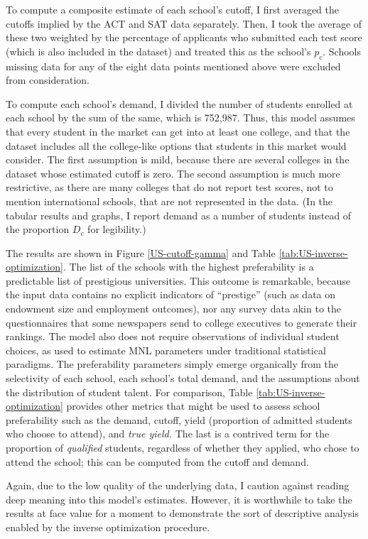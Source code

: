 \documentclass[12pt]{article}
\theoremstyle{definition}
\begin{document}
To compute a composite estimate of each school's cutoff, I first averaged the cutoffs implied by the ACT and SAT data separately. Then, I took the average of these two weighted by the percentage of applicants who submitted each test score (which is also included in the dataset) and treated this as the school's $p_c$. Schools missing data for any of the eight data points mentioned above were excluded from consideration.

To compute each school's demand, I divided the number of students enrolled at each school by the sum of the same, which is 752,987. Thus, this model assumes that every student in the market can get into at least one college, and that the dataset includes all the college-like options that students in this market would consider. The first assumption is mild, because there are several colleges in the dataset whose estimated cutoff is zero. The second assumption is much more restrictive, as there are many colleges that do not report test scores, not to mention international schools, that are not represented in the data. (In the tabular results and graphs, I report demand as a number of students instead of the proportion $D_c$ for legibility.)

The results are shown in Figure \ref{US-cutoff-gamma} and Table \ref{tab:US-inverse-optimization}. The list of the schools with the highest preferability is a predictable list of prestigious universities. This outcome is remarkable, because the input data contains no explicit indicators of ``prestige'' (such as data on endowment size and employment outcomes), nor any survey data akin to the questionnaires that some newspapers send to college executives to generate their rankings. The model also does not require observations of individual student choices, as used to estimate MNL parameters under traditional statistical paradigms. The preferability parameters simply emerge organically from the selectivity of each school, each school's total demand, and the assumptions about the distribution of student talent. For comparison, Table \ref{tab:US-inverse-optimization} provides other metrics that might be used to assess school preferability such as the demand, cutoff, yield (proportion of admitted students who choose to attend), and \emph{true yield.} The last is a contrived term for the proportion of \emph{qualified} students, regardless of whether they applied, who chose to attend the school; this can be computed from the cutoff and demand. 

Again, due to the low quality of the underlying data, I caution against reading deep meaning into this model's estimates. However, it is worthwhile to take the results at face value for a moment to demonstrate the sort of descriptive analysis enabled by the inverse optimization procedure. 
\end{document}

